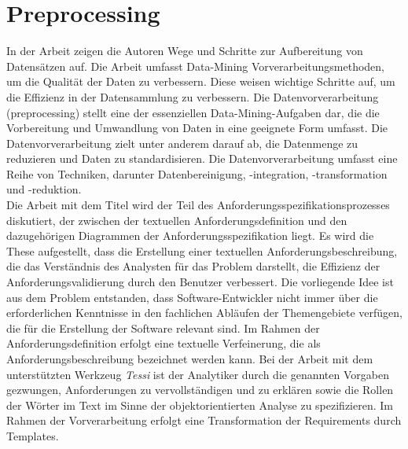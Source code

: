 \section{Preprocessing}
In der Arbeit \cite{alasadi2017review} zeigen die Autoren \citeauthor{alasadi2017review} Wege und Schritte zur Aufbereitung von Datensätzen auf. Die Arbeit umfasst Data-Mining Vorverarbeitungsmethoden, um die Qualität der Daten zu verbessern. Diese weisen wichtige Schritte auf, um die Effizienz in der Datensammlung zu verbessern. Die Datenvorverarbeitung (preprocessing) stellt eine der essenziellen Data-Mining-Aufgaben dar, die die Vorbereitung und Umwandlung von Daten in eine geeignete Form umfasst. Die Datenvorverarbeitung zielt unter anderem darauf ab, die Datenmenge zu reduzieren und Daten zu standardisieren. Die Datenvorverarbeitung umfasst eine Reihe von Techniken, darunter Datenbereinigung, -integration, -transformation und -reduktion. \\

Die Arbeit mit dem Titel \cite{kroha2000preprocessing} wird der Teil des Anforderungsspezifikationsprozesses diskutiert, der zwischen der textuellen Anforderungsdefinition und den dazugehörigen Diagrammen der Anforderungsspezifikation liegt. Es wird die These aufgestellt, dass die Erstellung einer textuellen Anforderungsbeschreibung, die das Verständnis des Analysten für das Problem darstellt, die Effizienz der Anforderungsvalidierung durch den Benutzer verbessert. Die vorliegende Idee ist aus dem Problem entstanden, dass Software-Entwickler nicht immer über die erforderlichen Kenntnisse in den fachlichen Abläufen der Themengebiete verfügen, die für die Erstellung der Software relevant sind. Im Rahmen der Anforderungsdefinition erfolgt eine textuelle Verfeinerung, die als Anforderungsbeschreibung bezeichnet werden kann. Bei der Arbeit mit dem unterstützten Werkzeug \emph{Tessi} ist der Analytiker durch die genannten Vorgaben gezwungen, Anforderungen zu vervollständigen und zu erklären sowie die Rollen der Wörter im Text im Sinne der objektorientierten Analyse zu spezifizieren. Im Rahmen der Vorverarbeitung erfolgt eine Transformation der Requirements durch Templates.

